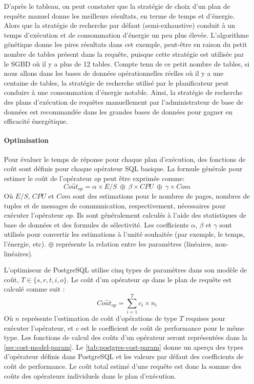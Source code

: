 D'après le tableau, on peut constater que la stratégie de choix d'un plan de requête manuel donne les meilleurs résultats, en terme de temps et d'énergie. Alors que la stratégie de recherche par défaut (semi-exhaustive) conduit à un temps d'exécution et de consommation d'énergie un peu plus élevée. L'algorithme génétique donne les pires résultats dans cet exemple, peut-être en raison du petit nombre de tables présent dans la requête, puisque cette stratégie est utilisée par le SGBD où il y a plus de 12 tables. Compte tenu de ce petit nombre de tables, si nous allons dans les bases de données opérationnelles réelles où il y a une centaine de tables, la stratégie de recherche utilisé par le planificateur peut conduire à une consommation d'énergie notable. Ainsi, la stratégie de recherche des plans d'exécution de requêtes manuellement par l'administrateur de base de données est recommandée dans les grandes bases de données pour gagner en efficacité énergétique.

\paragraph{Optimisation}
Pour évaluer le temps de réponse pour chaque plan d'exécution, des fonctions de coût sont définis pour chaque opérateur SQL basique. La formule générale pour estimer le coût de l'opérateur $op$ peut être exprimée comme:
\begin{equation}
 Co\hat{u}t_{op} = \alpha \times E/S \: \oplus \: \beta \times CPU \: \oplus \: \gamma \times Com
\end{equation} 
Où $E/S$, $CPU$ et $Com$ sont des estimations pour le nombres de pages, nombres de tuples et de messages de communication, respectivement, nécessaires pour exécuter l'opérateur $op$. Ils sont généralement calculés à l'aide des statistiques de base de données et des formules de sélectivité. Les coefficients $\alpha$, $\beta$ et $\gamma$ sont utilisés pour convertir les estimations à l'unité souhaitée (par exemple, le temps, l'énergie, etc). $\oplus$ représente la relation entre les paramètres (linéaires, non-linéaires).

L'optimiseur de PostgreSQL utilise cinq types de paramètres dans son modèle de coût, $T \in \{s, r, t, i, o\}$. Le coût d'un opérateur $op$ dans le plan de requête est calculé comme suit :
\begin{equation}
 Co\hat{u}t_{op} = \sum_{i=1}^{T} c_{i} \times n_{i}
\end{equation} 
Où $n$ représente l'estimation de coût d'opérations de type $T$ requises pour exécuter l'opérateur, et $c$ est le coefficient de coût de performance pour le même type. Les fonctions de calcul des coûts d'un opérateur seront représentées dans la \ref{sec:cost-model-param}. Le \ref{tab:postgres-cost-param} donne un aperçu des types d'opérateur définis dans PostgreSQL et les valeurs par défaut des coefficients de coût de performance. Le coût total estimé d'une requête est donc la somme des coûts des opérateurs individuels dans le plan d'exécution.


